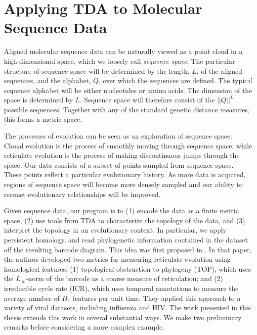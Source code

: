 \section{Applying TDA to Molecular Sequence Data}
\label{bg:top4bio}

Aligned molecular sequence data can be naturally viewed as a point cloud in a high-dimensional space, which we loosely call \emph{sequence space}.
The particular structure of sequence space will be determined by the length, $L$, of the aligned sequences, and the alphabet, $Q$, over which the sequences are defined.
The typical sequence alphabet will be either nucleotides or amino acids.
The dimension of the space is determined by $L$.
Sequence space will therefore consist of the $||Q||^L$ possible sequences.
Together with any of the standard genetic distance measures, this forms a metric space.

The processes of evolution can be seen as an exploration of sequence space.
Clonal evolution is the process of smoothly moving through sequence space, while reticulate evolution is the process of making discontinuous jumps through the space.
Our data consists of a subset of points sampled from sequence space.
These points reflect a particular evolutionary history.
As more data is acquired, regions of sequence space will become more densely sampled and our ability to reconst evolutionary relationships will be improved.

Given sequence data, our program is to (1) encode the data as a finite metric space, (2) use tools from TDA to characterize the topology of the data, and (3) interpret the topology in an evolutionary context.
In particular, we apply persistent homology, and read phylogenetic information contained in the dataset off the resulting barcode diagram.
This idea was first proposed in \cite{Chan:2013}.
In that paper, the authors developed two metrics for measuring reticulate evolution using homological features: (1) topological obstruction to phylogeny (TOP), which uses the $L_{\infty}$-norm of the barcode as a coarse measure of reticulation; and (2) irreducible cycle rate (ICR), which uses temporal annotations to measure the average number of $H_1$ features per unit time.
They applied this approach to a variety of viral datasets, including influenza and HIV.
The work presented in this thesis extends this work in several substantial ways.
We make two preliminary remarks before considering a more complex example.

